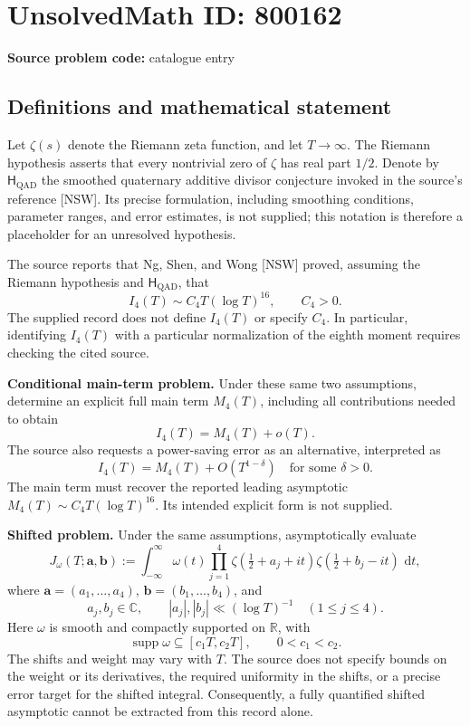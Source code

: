\documentclass[11pt]{article}
\newcommand{\R}{\mathbb{R}}
\newcommand{\C}{\mathbb{C}}
\newcommand{\dd}{\,\mathrm{d}}
\begin{document}
\section*{UnsolvedMath ID: 800162}
\textbf{Source problem code:} catalogue entry
\subsection{Definitions and mathematical statement}
Let \(\zeta(s)\) denote the Riemann zeta function, and let \(T\to\infty\). The Riemann hypothesis asserts that every nontrivial zero of \(\zeta\) has real part \(1/2\). Denote by \(\mathsf{H}_{\mathrm{QAD}}\) the smoothed quaternary additive divisor conjecture invoked in the source's reference [NSW]. Its precise formulation, including smoothing conditions, parameter ranges, and error estimates, is not supplied; this notation is therefore a placeholder for an unresolved hypothesis.

The source reports that Ng, Shen, and Wong [NSW] proved, assuming the Riemann hypothesis and \(\mathsf{H}_{\mathrm{QAD}}\), that
\[
I_4(T)\sim C_4T(\log T)^{16},\qquad C_4>0.
\]
The supplied record does not define \(I_4(T)\) or specify \(C_4\). In particular, identifying \(I_4(T)\) with a particular normalization of the eighth moment requires checking the cited source.

\textbf{Conditional main-term problem.} Under these same two assumptions, determine an explicit full main term \(M_4(T)\), including all contributions needed to obtain
\[
I_4(T)=M_4(T)+o(T).
\]
The source also requests a power-saving error as an alternative, interpreted as
\[
I_4(T)=M_4(T)+O(T^{1-\delta})
\quad\text{for some }\delta>0.
\]
The main term must recover the reported leading asymptotic \(M_4(T)\sim C_4T(\log T)^{16}\). Its intended explicit form is not supplied.

\textbf{Shifted problem.} Under the same assumptions, asymptotically evaluate
\[
J_{\omega}(T;\boldsymbol a,\boldsymbol b)
:=\int_{-\infty}^{\infty}\omega(t)
\prod_{j=1}^{4}
\zeta\!\left(\tfrac12+a_j+it\right)
\zeta\!\left(\tfrac12+b_j-it\right)\,\dd t,
\]
where \(\boldsymbol a=(a_1,\ldots,a_4)\), \(\boldsymbol b=(b_1,\ldots,b_4)\), and
\[
a_j,b_j\in\C,\qquad |a_j|,|b_j|\ll(\log T)^{-1}
\quad(1\le j\le4).
\]
Here \(\omega\) is smooth and compactly supported on \(\R\), with
\[
\operatorname{supp}\omega\subseteq[c_1T,c_2T],\qquad 0<c_1<c_2.
\]
The shifts and weight may vary with \(T\). The source does not specify bounds on the weight or its derivatives, the required uniformity in the shifts, or a precise error target for the shifted integral. Consequently, a fully quantified shifted asymptotic cannot be extracted from this record alone.
\end{document}

